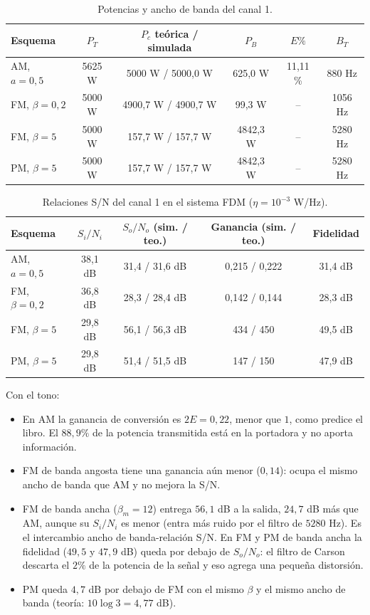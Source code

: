 \documentclass[11pt,a4paper]{article}
\numberwithin{equation}{section}
\begin{document}
\begin{table}[H]
  \centering
  \begin{tabular}{lccccc}
    \toprule
    Esquema & $P_T$ & $P_c$ teórica / simulada & $P_B$ & $E\%$ & $B_T$ \\
    \midrule
    AM, $a=0,5$ & 5625 W & 5000 W / 5000,0 W & 625,0 W & 11,11 \% & 880 Hz \\
    FM, $\beta=0,2$ & 5000 W & 4900,7 W / 4900,7 W & 99,3 W & -- & 1056 Hz \\
    FM, $\beta=5$ & 5000 W & 157,7 W / 157,7 W & 4842,3 W & -- & 5280 Hz \\
    PM, $\beta=5$ & 5000 W & 157,7 W / 157,7 W & 4842,3 W & -- & 5280 Hz \\
    \bottomrule
  \end{tabular}
  \caption{Potencias y ancho de banda del canal 1.}
\end{table}

\begin{table}[H]
  \centering
  \begin{tabular}{lcccc}
    \toprule
    Esquema & $S_i/N_i$ & $S_o/N_o$ (sim. / teo.) & Ganancia (sim. / teo.) & Fidelidad \\
    \midrule
    AM, $a=0,5$ & 38,1 dB & 31,4 / 31,6 dB & 0,215 / 0,222 & 31,4 dB \\
    FM, $\beta=0,2$ & 36,8 dB & 28,3 / 28,4 dB & 0,142 / 0,144 & 28,3 dB \\
    FM, $\beta=5$ & 29,8 dB & 56,1 / 56,3 dB & 434 / 450 & 49,5 dB \\
    PM, $\beta=5$ & 29,8 dB & 51,4 / 51,5 dB & 147 / 150 & 47,9 dB \\
    \bottomrule
  \end{tabular}
  \caption{Relaciones S/N del canal 1 en el sistema FDM ($\eta=10^{-3}$ W/Hz).}
  \label{tab:snr_tono}
\end{table}

Con el tono:
\begin{itemize}
  \item En AM la ganancia de conversión es $2E=0,22$, menor que $1$, como predice el libro. El $88,9\%$ de la potencia transmitida está en la portadora y no aporta información.
  \item FM de banda angosta tiene una ganancia aún menor ($0,14$): ocupa el mismo ancho de banda que AM y no mejora la S/N.
  \item FM de banda ancha ($\beta_m=12$) entrega $56,1$ dB a la salida, $24,7$ dB más que AM, aunque su $S_i/N_i$ es menor (entra más ruido por el filtro de $5280$ Hz). Es el intercambio ancho de banda-relación S/N. En FM y PM de banda ancha la fidelidad ($49,5$ y $47,9$ dB) queda por debajo de $S_o/N_o$: el filtro de Carson descarta el $2\%$ de la potencia de la señal y eso agrega una pequeña distorsión.
  \item PM queda $4,7$ dB por debajo de FM con el mismo $\beta$ y el mismo ancho de banda (teoría: $10\log 3=4,77$ dB).
\end{itemize}
\end{document}
